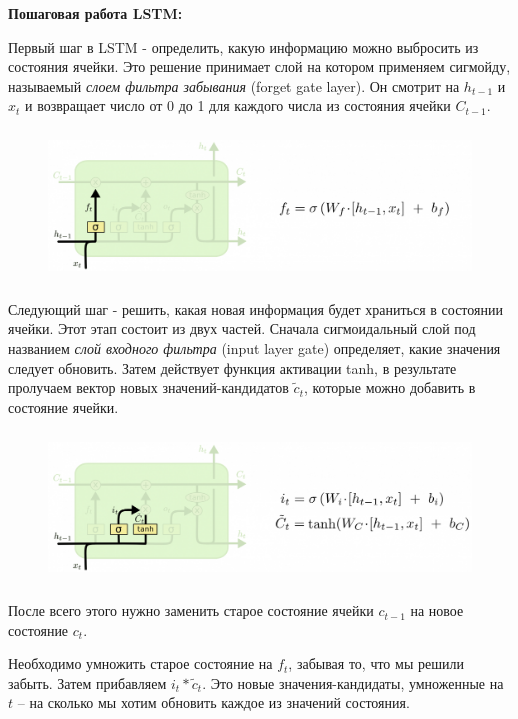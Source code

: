     \textbf{Пошаговая работа LSTM:}
    
    Первый шаг в LSTM - определить, какую информацию можно выбросить из состояния ячейки. Это решение принимает слой на котором применяем сигмойду, называемый \textit{слоем фильтра забывания} (forget gate layer). Он смотрит на $h_{t-1}$ и $x_t$ и возвращает число от 0 до 1 для каждого числа из состояния ячейки $C_{t-1}$.
    
    \begin{figure}[ht!]
		\centering
		\captionsetup{justification=centering}
		\includegraphics[height=40mm]{img/LSTM_step1.png}
	\end{figure}
	
	Следующий шаг - решить, какая новая информация будет храниться в состоянии ячейки. Этот этап состоит из двух частей. Сначала сигмоидальный слой под названием \textit{слой входного фильтра} (input layer gate) определяет, какие значения следует обновить. Затем действует функция активации tanh, в результате пролучаем вектор новых значений-кандидатов $\tilde{c}_t$, которые можно добавить в состояние ячейки.
    
    \begin{figure}[ht!]
		\centering
		\captionsetup{justification=centering}
		\includegraphics[height=40mm]{img/LSTM_step2.png}
	\end{figure}
	
    После всего этого нужно заменить старое состояние ячейки $c_{t-1}$ на новое состояние $c_t$.
    
    Необходимо умножить старое состояние на $f_t$, забывая то, что мы решили забыть. Затем прибавляем $i_t*\tilde{c}_t$. Это новые значения-кандидаты, умноженные на $t$ – на сколько мы хотим обновить каждое из значений состояния.
    
